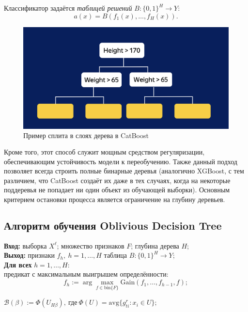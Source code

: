 Классификатор задаётся \textit{таблицей решений} $B: \{0,1\}^H \to Y$:
$$
a(x) = B(f_1(x), \ldots, f_H(x)).
$$

\begin{figure}[h]
    \centering
    \includegraphics[width=15cm]{chapters/boosting/images/Tree.png}
    \caption{Пример сплита в слоях дерева в CatBoost}
\end{figure}

Кроме того, этот способ служит мощным средством регуляризации, обеспечивающим устойчивость модели к переобучению. Также данный подход позволяет всегда строить полные бинарные деревья (аналогично XGBoost, с тем различием, что CatBoost создаёт их даже в тех случаях, когда на некоторые поддеревья не попадает ни один объект из обучающей выборки). Основным критерием остановки процесса является ограничение на глубину деревьев.

\subsection*{Алгоритм обучения Oblivious Decision Tree}

\begin{tcolorbox}[colback=Lavender!10, colframe=Lavender]
\textbf{Вход:} выборка $X^\ell$; множество признаков $F$; глубина дерева $H$;\\
\textbf{Выход:} признаки $f_h, \ h = 1, \ldots, H$  таблица $B: \{0,1\}^H \to Y$;\\
\textbf{Для всех} $h = 1, \ldots, H$:\\
предикат с максимальным выигрышем определённости:
$$
f_h := \arg\max_{f \in \mathrm{bin}\{F\}} \text{Gain}(f_1, \ldots, f_{h-1}, f);
$$

\(\mathcal{B}(\beta) := \Phi(U_{H\beta}), \ \text{где} \ \Phi(U) = \text{avg}\{g_{ti}^r : x_i \in U\};\)
\end{tcolorbox}

